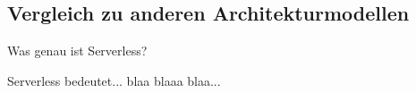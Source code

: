 \subsection{Vergleich zu anderen Architekturmodellen}

Was genau ist Serverless?

Serverless bedeutet... blaa blaaa blaa...
